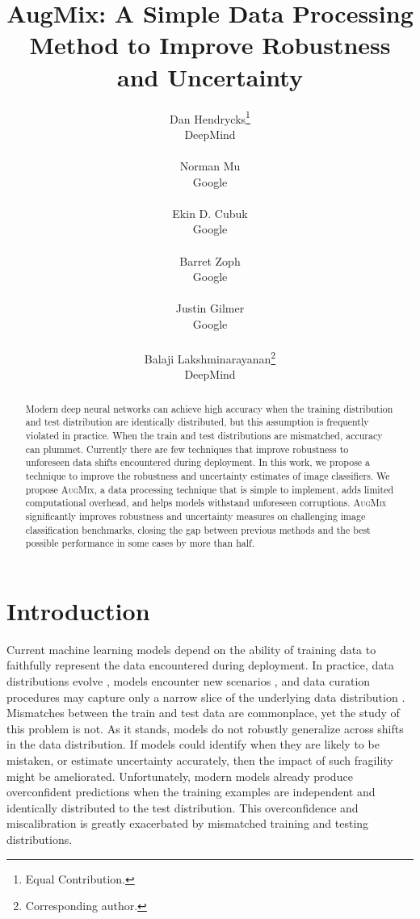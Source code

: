 \documentclass{article} \usepackage{iclr2020_conference,times}
\title{AugMix: A Simple Data Processing Method to Improve Robustness and Uncertainty
}
\author{Dan Hendrycks\thanks{Equal Contribution.}\\
DeepMind\\
\email{hendrycks@berkeley.edu} \\
\And
Norman Mu\footnotemark[1]\\
Google\\
\email{normanmu@google.com} \\
\And
Ekin D. Cubuk\\
Google\\
\email{cubuk@google.com} \\
\And
Barret Zoph\\
Google\\
\email{barretzoph@google.com} \\
\And
Justin Gilmer\\
Google\\
\email{gilmer@google.com} \\
\And
Balaji Lakshminarayanan\thanks{Corresponding author.}\\
DeepMind \\
\email{balajiln@google.com}
}
\begin{document}
\setlength{\abovedisplayskip}{4pt}
\setlength{\belowdisplayskip}{4pt}

\maketitle

\begin{abstract}
Modern deep neural networks can achieve high accuracy when the training distribution and test distribution are identically distributed, but this assumption is frequently violated in practice. When the train and test distributions are mismatched, accuracy can plummet. Currently there are few techniques that improve robustness to unforeseen data shifts encountered during deployment. In this work, we propose a technique to improve the robustness and uncertainty estimates of image classifiers.
We propose \textsc{AugMix}, a data processing technique that is simple to implement, adds limited computational overhead, and helps models withstand unforeseen corruptions. \textsc{AugMix} significantly improves robustness and uncertainty measures on challenging image classification benchmarks, closing the gap between previous methods and the best possible performance in some cases by more than half. 
\end{abstract}

\section{Introduction}




Current machine learning models depend on the ability of training data to faithfully represent the data encountered during deployment.
In practice, data distributions evolve \citep{Lipton2018DetectingAC}, models encounter new scenarios \citep{hendrycks17baseline}, and data curation procedures may capture only a narrow slice of the underlying data distribution \citep{Torralba2011UnbiasedLA}.
Mismatches between the train and test data are commonplace, yet the study of this problem is not. As it stands, models do not robustly generalize across shifts in the data distribution.
If models could identify when they are likely to be mistaken, or estimate uncertainty accurately, then the impact of such fragility might be ameliorated. Unfortunately, modern models already produce overconfident predictions when the training examples are independent and identically distributed to the test distribution. This overconfidence and miscalibration is greatly exacerbated by mismatched training and testing distributions.
\end{document}
